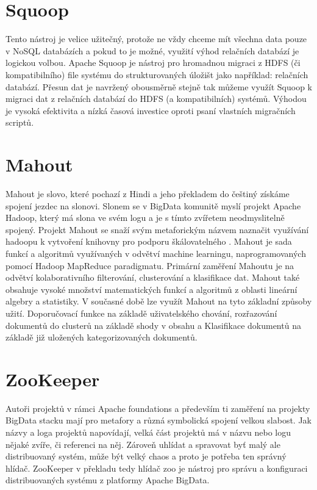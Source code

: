 \section{Squoop}

Tento nástroj je velice užitečný, protože ne vždy chceme mít všechna data pouze v NoSQL databázích a pokud to je možné, využití výhod relačních databází je logickou volbou. Apache Squoop je nástroj pro hromadnou migraci z HDFS (či kompatibilního) file systému do strukturovaných úložišt jako například: relačních databází. Přesun dat je navržený obousměrně stejně tak můžeme využít Squoop k migraci dat z  relačních databází do HDFS (a kompatibilních) systémů. Výhodou je vysoká efektivita a nízká časová investice oproti psaní vlastních migračních scriptů.

\section{Mahout}

Mahout je slovo, které pochazí z Hindi a jeho překladem do češtiný získáme spojení jezdec na slonovi. Slonem se v BigData komunitě myslí projekt Apache Hadoop, který má slona ve svém logu a je s tímto zvířetem neodmyslitelně spojený. Projekt Mahout se snaží svým metaforickým názvem naznačit využívání hadoopu k vytvoření knihovny pro podporu škálovatelného . Mahout je sada funkcí a algoritmů využívaných v odvětví machine learningu, naprogramovaných pomocí Hadoop MapReduce paradigmatu. Primární zaměření Mahoutu je na odvětví kolaborativního filterování, clusterování a klasifikace dat. Mahout také obsahuje vysoké množství matematických funkcí a algoritmů z oblasti lineární  algebry a statistiky. V současné době lze využít Mahout na tyto základní způsoby užití. Doporučovací funkce na základě uživatelského chování, rozřazování dokumentů do clusterů na základě shody v obsahu a Klasifikace dokumentů na základě již uložených kategorizovaných dokumentů. 

\section {ZooKeeper}

Autoři projektů v rámci Apache foundations a především ti zaměření na projekty BigData stacku mají pro metafory a různá symbolická spojení velkou slabost. Jak názvy a loga projektů napovídají, velká část projektů má v názvu nebo logu nějaké zvíře, či referenci na něj. Zároveň uhlídat a spravovat byť malý ale distribuovaný systém, může být velký chaos a proto je potřeba ten správný hlídač. ZooKeeper v překladu tedy hlídač zoo je nástroj pro správu a konfiguraci distribuovaných systému z platformy Apache BigData. 

